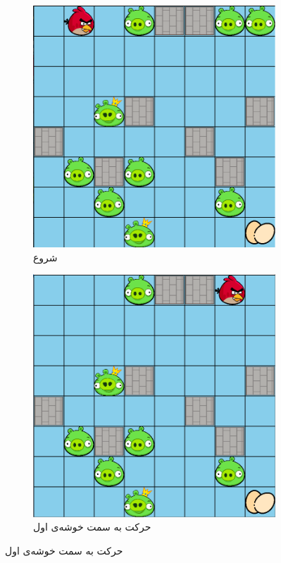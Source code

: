 \documentclass[11pt, a4paper, oneside]{report}
\begin{document}
\begin{figure}[H]
	\begin{subfigure}{0.40\textwidth}
		\includegraphics[width=\textwidth]{./images/mdp1}
		\caption{شروع}
		\label{fig:a}
	\end{subfigure}
	\hfill
	\begin{subfigure}{0.40\textwidth}
		\includegraphics[width=\textwidth]{./images/mdp2}
		\caption{حرکت به سمت خوشه‌ی اول}
		\label{fig:b}
	\end{subfigure}
	

\end{figure}
\end{document}
